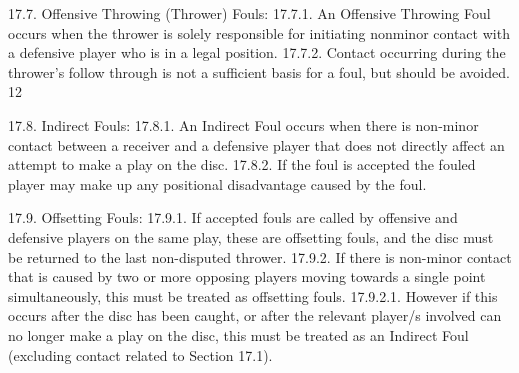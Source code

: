 17.7. Offensive Throwing (Thrower) Fouls:
17.7.1. An Offensive Throwing Foul occurs when the thrower is solely responsible for initiating nonminor contact with a defensive player who is in a legal position.
17.7.2. Contact occurring during the thrower's follow through is not a sufficient basis for a foul, but
should be avoided.
12

17.8. Indirect Fouls:
17.8.1. An Indirect Foul occurs when there is non-minor contact between a receiver and a defensive
player that does not directly affect an attempt to make a play on the disc.
17.8.2. If the foul is accepted the fouled player may make up any positional disadvantage caused by the
foul.

17.9. Offsetting Fouls:
17.9.1. If accepted fouls are called by offensive and defensive players on the same play, these are
offsetting fouls, and the disc must be returned to the last non-disputed thrower.
17.9.2. If there is non-minor contact that is caused by two or more opposing players moving towards a
single point simultaneously, this must be treated as offsetting fouls.
17.9.2.1. However if this occurs after the disc has been caught, or after the relevant player/s
involved can no longer make a play on the disc, this must be treated as an Indirect Foul
(excluding contact related to Section 17.1).
